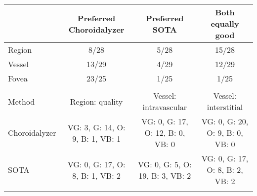 \begin{tabular}{@{}lccc@{}}
\toprule
 & Preferred Choroidalyzer & Preferred SOTA & Both equally good \\
\midrule
Region & 8/28 & 5/28 & 15/28 \\
Vessel & 13/29 & 4/29 & 12/29 \\
Fovea & 23/25 & 1/25 & 1/25\\ 
\midrule
& & & \\
\midrule
Method & Region: quality & Vessel: intravascular & Vessel: interstitial \\ \midrule
Choroidalyzer & VG: 3, G: 14, O: 9, B: 1, VB: 1 & VG: 0, G: 17, O: 12, B: 0, VB: 0 & VG: 0, G: 20, O: 9, B: 0, VB: 0 \\
SOTA & VG: 0, G: 17, O: 8, B: 1, VB: 2 & VG: 0, G: 5, O: 19, B: 3, VB: 2 & VG: 0, G: 17, O: 8, B: 2, VB: 2 \\ 
\bottomrule
\hspace{0.5em}
\end{tabular}%
